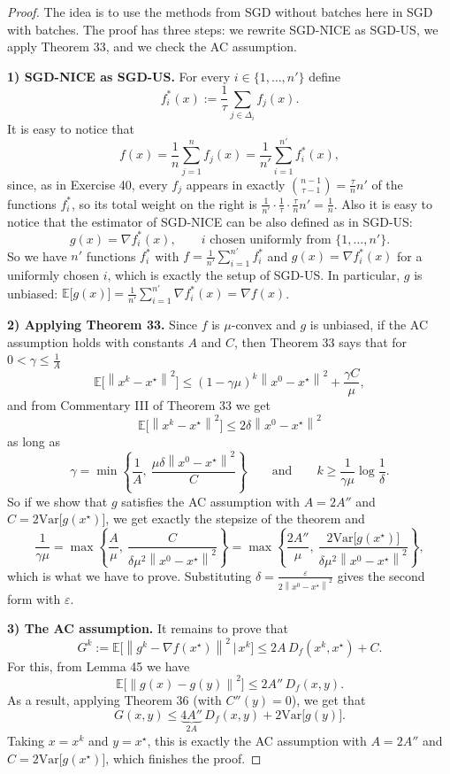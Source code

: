 \documentclass[11pt,a4paper]{article}
\newcommand{\E}{\mathbb{E}}
\newcommand{\norm}[1]{\left\| #1 \right\|}
\newcommand{\xs}{x^\star}
\newcommand{\Var}{\mathrm{Var}}
\begin{document}
\begin{proof}
The idea is to use the methods from SGD without batches here in SGD with batches.
The proof has three steps: we rewrite SGD-NICE as SGD-US, we apply Theorem 33, and we check the AC
assumption.

\medskip
\noindent\textbf{1) SGD-NICE as SGD-US.}
For every $i \in \{1,\dots,n'\}$ define
\[
  f_i^*(x) := \frac{1}{\tau}\sum_{j \in \Delta_i} f_j(x).
\]
It is easy to notice that
\[
  f(x) = \frac{1}{n}\sum_{j=1}^n f_j(x) = \frac{1}{n'}\sum_{i=1}^{n'} f_i^*(x),
\]
since, as in Exercise 40, every $f_j$ appears in exactly $\binom{n-1}{\tau-1} = \frac{\tau}{n}n'$ of the
functions $f_i^*$, so its total weight on the right is $\frac{1}{n'}\cdot\frac{1}{\tau}\cdot\frac{\tau}{n}n' = \frac{1}{n}$.
Also it is easy to notice that the estimator of SGD-NICE can be also defined as in SGD-US:
\[
  g(x) = \nabla f_i^*(x), \qquad i \text{ chosen uniformly from } \{1,\dots,n'\}.
\]
So we have $n'$ functions $f_i^*$ with $f = \frac{1}{n'}\sum_{i=1}^{n'} f_i^*$ and $g(x) = \nabla f_i^*(x)$ for a
uniformly chosen $i$, which is exactly the setup of SGD-US. In particular, $g$ is unbiased:
$\E\bigl[g(x)\bigr] = \frac{1}{n'}\sum_{i=1}^{n'}\nabla f_i^*(x) = \nabla f(x)$.

\medskip
\noindent\textbf{2) Applying Theorem 33.}
Since $f$ is $\mu$-convex and $g$ is unbiased, if the AC assumption holds with constants $A$ and $C$, then
Theorem 33 says that for $0 < \gamma \le \frac{1}{A}$
\[
  \E\bigl[\norm{x^k - \xs}^2\bigr] \le (1-\gamma\mu)^k\norm{x^0 - \xs}^2 + \frac{\gamma C}{\mu},
\]
and from Commentary III of Theorem 33 we get
\[
  \E\bigl[\norm{x^k - \xs}^2\bigr] \le 2\delta\norm{x^0 - \xs}^2
\]
as long as
\[
  \gamma = \min\left\{\frac{1}{A},\ \frac{\mu\delta\norm{x^0 - \xs}^2}{C}\right\}
  \qquad\text{and}\qquad k \ge \frac{1}{\gamma\mu}\log\frac{1}{\delta}.
\]
So if we show that $g$ satisfies the AC assumption with $A = 2A''$ and $C = 2\Var\bigl[g(\xs)\bigr]$, we get
exactly the stepsize of the theorem and
\[
  \frac{1}{\gamma\mu} = \max\left\{\frac{A}{\mu},\ \frac{C}{\delta\mu^2\norm{x^0 - \xs}^2}\right\}
  = \max\left\{\frac{2A''}{\mu},\ \frac{2\Var\bigl[g(\xs)\bigr]}{\delta\mu^2\norm{x^0 - \xs}^2}\right\},
\]
which is what we have to prove. Substituting $\delta = \frac{\varepsilon}{2\norm{x^0 - \xs}^2}$ gives the second form
with $\varepsilon$.

\medskip
\noindent\textbf{3) The AC assumption.}
It remains to prove that
\[
  G^k := \E\bigl[\norm{g^k - \nabla f(\xs)}^2 \,\big|\, x^k\bigr] \le 2A\,D_f(x^k,\xs) + C .
\]
For this, from Lemma 45 we have
\[
  \E\bigl[\norm{g(x) - g(y)}^2\bigr] \le 2A''\,D_f(x,y) .
\]
As a result, applying Theorem 36 (with $C''(y) = 0$), we get that
\[
  G(x,y) \le \underbrace{4A''}_{2A}\,D_f(x,y) + 2\Var\bigl[g(y)\bigr] .
\]
Taking $x = x^k$ and $y = \xs$, this is exactly the AC assumption with $A = 2A''$ and
$C = 2\Var\bigl[g(\xs)\bigr]$, which finishes the proof.
\end{proof}
\end{document}
